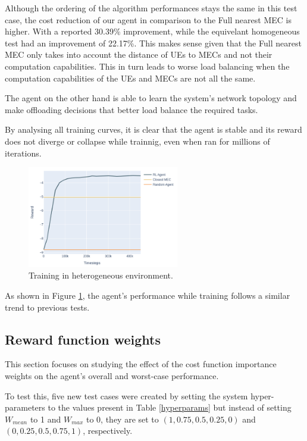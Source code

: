 \documentclass[conference]{IEEEtran}
\begin{document}
Although the ordering of the algorithm performances stays the same in this test case, the cost reduction of our agent in comparison to the Full nearest MEC is higher. With a reported 30.39\% improvement, while the equivelant homogeneous test had an improvement of 22.17\%. This makes sense given that the Full nearest MEC only takes into account the distance of \acrshort{UE}s to \acrshort{MEC}s and not their computation capabilities. This in turn leads to worse load balancing when the computation capabilities of the \acrshort{UE}s and \acrshort{MEC}s are not all the same.

The agent on the other hand is able to learn the system's network topology and make offloading decisions that better load balance the required tasks. 

By analysing all training curves, it is clear that the agent is stable and its reward does not diverge or collapse while trainnig, even when ran for millions of iterations.

\begin{figure}[H]
  \centering
  \includegraphics[width=250px]{images/5_10_training_hetero.png}
  \caption{Training in heterogeneous environment.}  \label{hetero_training}
\end{figure}

As shown in Figure \ref{hetero_training}, the agent's performance while training follows a similar trend to previous tests.

\subsection{Reward function weights} \label{reward_section}

This section focuses on studying the effect of the cost function importance weights on the agent's overall and worst-case performance.

To test this, five new test cases were created by setting the system hyper-parameters to the values present in Table \ref{hyperparams} but instead of setting $W_{mean}$ to 1 and $W_{max}$ to 0, they are set to $(1, 0.75, 0.5, 0.25, 0)$ and $(0, 0.25, 0.5, 0.75, 1)$, respectively.
\end{document}
